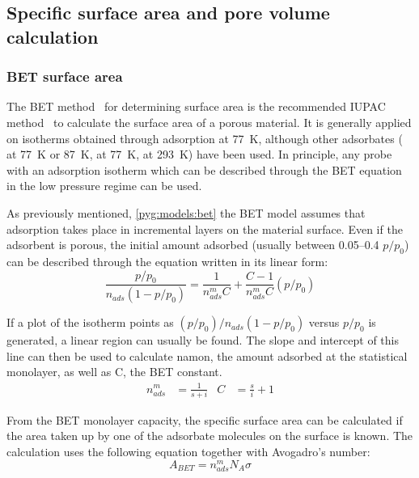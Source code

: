 
\subsection{Specific surface area and pore volume calculation}

\subsubsection{\gls{BET} surface area}\label{pyg:charac:betarea}

The \gls{BET} method~\cite{brunauerAdsorptionGasesMultimolecular1938}
for determining surface area is the recommended \gls{IUPAC}
method~\cite{thommesPhysisorptionGasesSpecial2015}
to calculate the surface area of a porous material.
It is generally applied on isotherms obtained through 
adsorption at \SI{77}{\kelvin}, although other adsorbates
( at \SI{77}{\kelvin} or \SI{87}{\kelvin},
 at \SI{77}{\kelvin},  at \SI{293}{\kelvin})
have been used. In principle, any probe with an adsorption isotherm
which can be described through the \gls{BET} equation in the low pressure regime
can be used.

As previously mentioned, \autoref{pyg:models:bet} the \gls{BET} model assumes
that adsorption takes place in incremental layers on the material
surface. Even if the adsorbent is porous, the initial amount adsorbed
(usually between 0.05--0.4 \(p/p_0\)) can be
described through the equation written in its linear form:
%
\begin{equation}
	\frac{p/p_0}{n_{ads} (1-p/p_0)} = \frac{1}{n_{ads}^m C} + \frac{C - 1}{n_{ads}^m C}(p/p_0)
\end{equation}

If a plot of the isotherm points as \({(p/p_0)}/{n_{ads}(1-p/p_0)}\)
versus \(p/p_0\) is generated, a linear region
can usually be found. The slope and intercept of this line
can then be used to calculate \gls{namon}, the amount adsorbed at the
statistical monolayer, as well as \gls{C}, the \gls{BET} constant.
%
\begin{align}
	n_{ads}^{m} & = \frac{1}{s+i} & C & = \frac{s}{i} + 1
\end{align}

From the \gls{BET} monolayer capacity, the specific surface area can be
calculated if the area taken up by one of the adsorbate molecules
on the surface is known. The calculation uses the following equation
together with Avogadro's number:
%
\begin{equation}
	A_{BET} = n_{ads}^m N_A \sigma
\end{equation}

